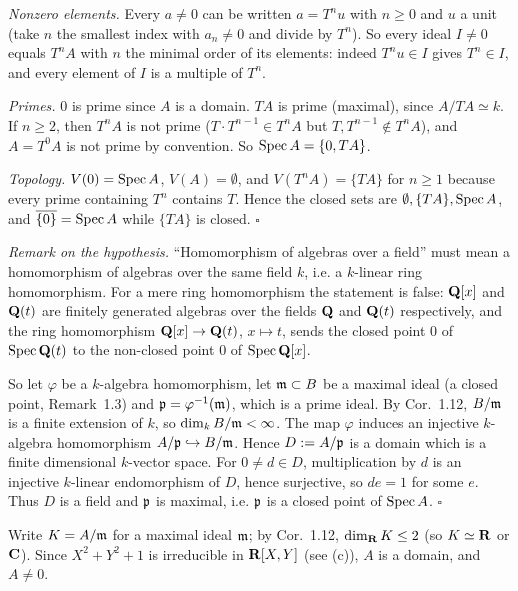 \documentclass[11pt]{article}
\begin{document}
\emph{Nonzero elements.} Every $a\neq0$ can be written $a=T^nu$ with $n\ge0$ and $u$ a unit (take $n$ the smallest index with $a_n\neq0$ and divide by $T^n$). So every ideal $I\neq0$ equals $T^nA$ with $n$ the minimal order of its elements: indeed $T^nu\in I$ gives $T^n\in I$, and every element of $I$ is a multiple of $T^n$.

\emph{Primes.} $0$ is prime since $A$ is a domain. $TA$ is prime (maximal), since $A/TA\simeq k$. If $n\ge2$, then $T^nA$ is not prime ($T\cdot T^{n-1}\in T^nA$ but $T,T^{n-1}\notin T^nA$), and $A=T^0A$ is not prime by convention. So $\operatorname{Spec} A=\{0,TA\}$.

\emph{Topology.} $V(0)=\operatorname{Spec} A$, $V(A)=\emptyset$, and $V(T^nA)=\{TA\}$ for $n\ge1$ because every prime containing $T^n$ contains $T$. Hence the closed sets are $\emptyset,\{TA\},\operatorname{Spec} A$, and $\overline{\{0\}}=\operatorname{Spec} A$ while $\{TA\}$ is closed. \hfill$\square$

\pf
\emph{Remark on the hypothesis.} ``Homomorphism of algebras over a field'' must mean a homomorphism of algebras over the same field $k$, i.e. a $k$-linear ring homomorphism. For a mere ring homomorphism the statement is false: $\mathbf Q[x]$ and $\mathbf Q(t)$ are finitely generated algebras over the fields $\mathbf Q$ and $\mathbf Q(t)$ respectively, and the ring homomorphism $\mathbf Q[x]\to\mathbf Q(t)$, $x\mapsto t$, sends the closed point $0$ of $\operatorname{Spec}\mathbf Q(t)$ to the non-closed point $0$ of $\operatorname{Spec}\mathbf Q[x]$.

So let $\varphi$ be a $k$-algebra homomorphism, let $\mathfrak m\subset B$ be a maximal ideal (a closed point, Remark~1.3) and $\mathfrak p=\varphi^{-1}(\mathfrak m)$, which is a prime ideal. By Cor.~1.12, $B/\mathfrak m$ is a finite extension of $k$, so $\dim_kB/\mathfrak m<\infty$. The map $\varphi$ induces an injective $k$-algebra homomorphism $A/\mathfrak p\hookrightarrow B/\mathfrak m$. Hence $D:=A/\mathfrak p$ is a domain which is a finite dimensional $k$-vector space. For $0\neq d\in D$, multiplication by $d$ is an injective $k$-linear endomorphism of $D$, hence surjective, so $de=1$ for some $e$. Thus $D$ is a field and $\mathfrak p$ is maximal, i.e. $\mathfrak p$ is a closed point of $\operatorname{Spec} A$. \hfill$\square$

\pf
Write $K=A/\mathfrak m$ for a maximal ideal $\mathfrak m$; by Cor.~1.12, $\dim_\mathbf R K\le2$ (so $K\simeq\mathbf R$ or $\mathbf C$). Since $X^2+Y^2+1$ is irreducible in $\mathbf R[X,Y]$ (see (c)), $A$ is a domain, and $A\neq 0$.
\end{document}
